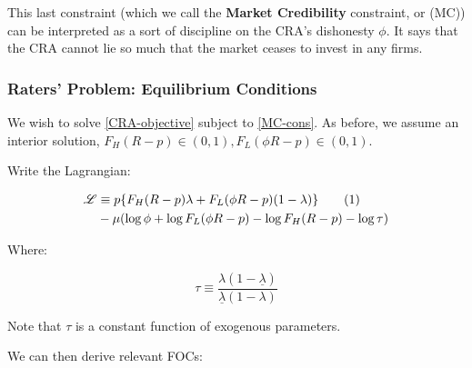 \documentclass{article}
\newcommand\numberthis{\addtocounter{equation}{1}\tag{\theequation}}
\theoremstyle{definition}
\begin{document}
This last constraint (which we call the \textbf{Market Credibility} constraint, or (MC)) can be interpreted as a sort of discipline on the CRA's dishonesty $\phi$. It says that the CRA cannot lie so much that the market ceases to invest in any firms. 

\subsubsection{Raters' Problem: Equilibrium Conditions}

We wish to solve \eqref{CRA-objective} subject to \eqref{MC-cons}. As before, we assume an interior solution, $F_H(R - p) \in (0, 1), F_L(\phi R - p) \in (0, 1)$.

Write the Lagrangian: 

\begin{align*}
    \mathscr{L} &\equiv p \{ F_H (R - p)\lambda + F_L(\phi R - p)(1 - \lambda)\} \label{Lagrangian} \numberthis \\ 
    &- \mu(\log \phi + \log F_L(\phi R - p) - \log F_H(R - p) - \log \tau)
\end{align*}

Where: 

\begin{equation}
    \tau \equiv \frac{\lambda (1 - \underline{\lambda})}{\underline{\lambda}(1 - \lambda)}
\end{equation}

Note that $\tau$ is a constant function of exogenous parameters. 

We can then derive relevant FOCs: 
\end{document}
